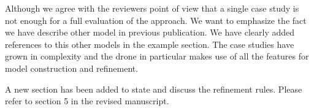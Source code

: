 \documentclass{response}
\begin{document}
\begin{comment}{Reviewer \#1}
  PS Could you put another zip version on the repository: I have had some
strange problems (missing characters) with some machine files? For such
files, I was not able to play again the proofs.
\end{comment}

\begin{response}
\end{response}

\begin{comment}{Reviewer \#2}
The paper introduces a technique for the refinement of `run to completion' 
statechart modelling notation (using SCXML language) while preserving safety 
properties. The statechart specification is translated to event-B formalism, 
allowing for formal verification using a theorem prover. The proposed approach 
is demonstrated using a statechart specification of a drone.

Positive points:
+ Interesting topic
+ Technique well motivated
+ The paper is well written and easy to read.

Negative points:
- One single case study is not enough to validate the proposed approach. The 
statechart specification of the drone is rather small. More elaborated models 
are required to validate the proposed approach.
\end{comment}

\begin{response}
Although we agree with the reviewers point of view that a single case study is
not enough for a full evaluation of the approach. We want to emphasize the fact
we have describe other model in previous publication. We have clearly added
references to this other models in the example section. The case studies have
grown in complexity and the drone in particular makes use of all the features
for model construction and refinement.
\end{response}


\begin{comment}{Reviewer \#2}
General comments:
  - The three refinement rules listed in the introduction have not been 
  described explicitly in the rest of the paper. Please describe them (using 
  minimal examples) in section 3.
\end{comment}

\begin{response}
A new section has been added to state and discuss the refinement rules. 
Please refer to section 5 in the revised manuscript.
\end{response}
\end{document}
